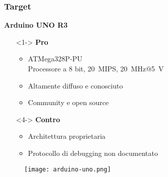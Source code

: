 \documentclass[aspectratio=169, handout]{beamer}
\begin{document}
    \begin{frame}
        \frametitle{Target}
    
        \begin{minipage}{.5\textwidth}
            \textbf{Arduino UNO R3}
            
            \begin{itemize}
                \item []<1-> \textbf{Pro}
                \begin{itemize}
                    \item <1-> ATMega328P-PU\\{\footnotesize Processore a 8 bit, \SI{20}{MIPS}, \SI{20}{\mega\hertz}@\SI{5}{\volt}}\cite{avr:m328p}
                    \item <2-> Altamente diffuso e conosciuto\cite{site:arduino-uno-doc}
                    \item <3-> Community e open source
                \end{itemize}
                \item []<4-> \textbf{Contro}
                \begin{itemize}
                    \item <4-> Architettura proprietaria
                    \item <5-> Protocollo di debugging non documentato\cite{site:dw-reverse-engeneering}
                \end{itemize}
            \end{itemize}            
        \end{minipage}
        \begin{minipage}{.48\textwidth}
            \begin{figure}
                \texttt{[image: arduino-uno.png]}
            \end{figure}    
        \end{minipage}
    \end{frame}
    
\end{document}
